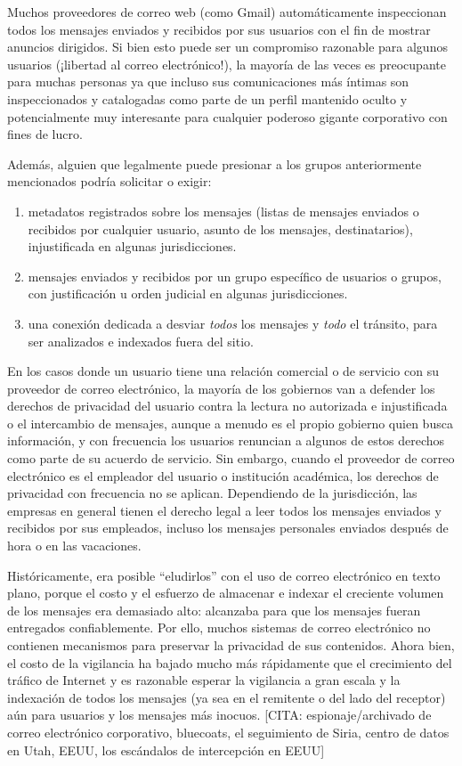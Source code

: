 \documentclass[10pt,a5paper,twoside,,]{book}
\providecommand{\tightlist}{%
  \setlength{\itemsep}{0pt}\setlength{\parskip}{0pt}}
\begin{document}
Muchos proveedores de correo web (como Gmail) automáticamente
inspeccionan todos los mensajes enviados y recibidos por sus usuarios
con el fin de mostrar anuncios dirigidos. Si bien esto puede ser un
compromiso razonable para algunos usuarios (¡libertad al correo
electrónico!), la mayoría de las veces es preocupante para muchas
personas ya que incluso sus comunicaciones más íntimas son
inspeccionados y catalogadas como parte de un perfil mantenido oculto y
potencialmente muy interesante para cualquier poderoso gigante
corporativo con fines de lucro.

Además, alguien que legalmente puede presionar a los grupos
anteriormente mencionados podría solicitar o exigir:

\begin{enumerate}
\def\labelenumi{\arabic{enumi}.}
\tightlist
\item
  metadatos registrados sobre los mensajes (listas de mensajes enviados
  o recibidos por cualquier usuario, asunto de los mensajes,
  destinatarios), injustificada en algunas jurisdicciones.
\item
  mensajes enviados y recibidos por un grupo específico de usuarios o
  grupos, con justificación u orden judicial en algunas jurisdicciones.
\item
  una conexión dedicada a desviar \emph{todos} los mensajes y
  \emph{todo} el tránsito, para ser analizados e indexados fuera del
  sitio.
\end{enumerate}

En los casos donde un usuario tiene una relación comercial o de servicio
con su proveedor de correo electrónico, la mayoría de los gobiernos van
a defender los derechos de privacidad del usuario contra la lectura no
autorizada e injustificada o el intercambio de mensajes, aunque a menudo
es el propio gobierno quien busca información, y con frecuencia los
usuarios renuncian a algunos de estos derechos como parte de su acuerdo
de servicio. Sin embargo, cuando el proveedor de correo electrónico es
el empleador del usuario o institución académica, los derechos de
privacidad con frecuencia no se aplican. Dependiendo de la jurisdicción,
las empresas en general tienen el derecho legal a leer todos los
mensajes enviados y recibidos por sus empleados, incluso los mensajes
personales enviados después de hora o en las vacaciones.

Históricamente, era posible ``eludirlos'' con el uso de correo
electrónico en texto plano, porque el costo y el esfuerzo de almacenar e
indexar el creciente volumen de los mensajes era demasiado alto:
alcanzaba para que los mensajes fueran entregados confiablemente. Por
ello, muchos sistemas de correo electrónico no contienen mecanismos para
preservar la privacidad de sus contenidos. Ahora bien, el costo de la
vigilancia ha bajado mucho más rápidamente que el crecimiento del
tráfico de Internet y es razonable esperar la vigilancia a gran escala y
la indexación de todos los mensajes (ya sea en el remitente o del lado
del receptor) aún para usuarios y los mensajes más inocuos. {[}CITA:
espionaje/archivado de correo electrónico corporativo, bluecoats, el
seguimiento de Siria, centro de datos en Utah, EEUU, los escándalos de
intercepción en EEUU{]}
\end{document}
